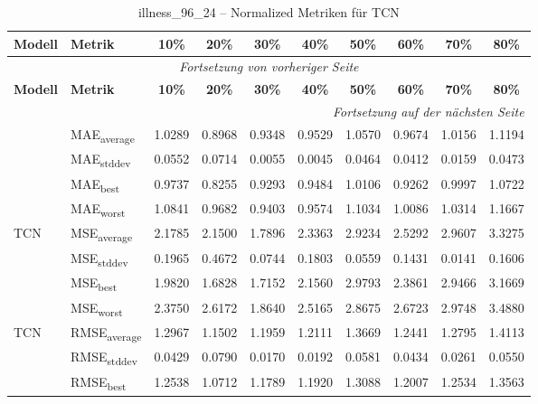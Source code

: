 {\small
\begin{longtable}{l l c c c c c c c c}
    \toprule
    \textbf{Modell} & \textbf{Metrik} & \textbf{10\%} & \textbf{20\%} & \textbf{30\%} & \textbf{40\%} & \textbf{50\%} & \textbf{60\%} & \textbf{70\%} & \textbf{80\%} \\
    \midrule
    \endfirsthead
    \multicolumn{10}{c}{\textit{Fortsetzung von vorheriger Seite}} \\
    \toprule
    \textbf{Modell} & \textbf{Metrik} & \textbf{10\%} & \textbf{20\%} & \textbf{30\%} & \textbf{40\%} & \textbf{50\%} & \textbf{60\%} & \textbf{70\%} & \textbf{80\%} \\
    \midrule
    \endhead
    \midrule
    \multicolumn{10}{r}{\textit{Fortsetzung auf der nächsten Seite}} \\
    \midrule
    \endfoot
    \bottomrule
    \caption{illness_96_24 -- Normalized Metriken für TCN}
    \label{tab:illness_96_24_normalized_tcn}
    \endlastfoot
\multirow{4}{*}{TCN} & MAE\textsubscript{average} & 1.0289 & 0.8968 & 0.9348 & 0.9529 & 1.0570 & 0.9674 & 1.0156 & 1.1194 \\
 & MAE\textsubscript{stddev} & 0.0552 & 0.0714 & 0.0055 & 0.0045 & 0.0464 & 0.0412 & 0.0159 & 0.0473 \\
 & MAE\textsubscript{best} & 0.9737 & 0.8255 & 0.9293 & 0.9484 & 1.0106 & 0.9262 & 0.9997 & 1.0722 \\
 & MAE\textsubscript{worst} & 1.0841 & 0.9682 & 0.9403 & 0.9574 & 1.1034 & 1.0086 & 1.0314 & 1.1667 \\
\cmidrule(lr){2-10}
\multirow{4}{*}{TCN} & MSE\textsubscript{average} & 2.1785 & 2.1500 & 1.7896 & 2.3363 & 2.9234 & 2.5292 & 2.9607 & 3.3275 \\
 & MSE\textsubscript{stddev} & 0.1965 & 0.4672 & 0.0744 & 0.1803 & 0.0559 & 0.1431 & 0.0141 & 0.1606 \\
 & MSE\textsubscript{best} & 1.9820 & 1.6828 & 1.7152 & 2.1560 & 2.9793 & 2.3861 & 2.9466 & 3.1669 \\
 & MSE\textsubscript{worst} & 2.3750 & 2.6172 & 1.8640 & 2.5165 & 2.8675 & 2.6723 & 2.9748 & 3.4880 \\
\cmidrule(lr){2-10}
\multirow{4}{*}{TCN} & RMSE\textsubscript{average} & 1.2967 & 1.1502 & 1.1959 & 1.2111 & 1.3669 & 1.2441 & 1.2795 & 1.4113 \\
 & RMSE\textsubscript{stddev} & 0.0429 & 0.0790 & 0.0170 & 0.0192 & 0.0581 & 0.0434 & 0.0261 & 0.0550 \\
 & RMSE\textsubscript{best} & 1.2538 & 1.0712 & 1.1789 & 1.1920 & 1.3088 & 1.2007 & 1.2534 & 1.3563 \\

\end{longtable}}

